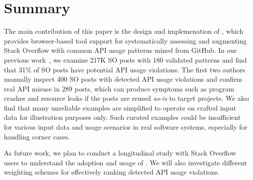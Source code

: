 \section{Summary}
\label{sec:summary}
The main contribution of this paper is the design and implemenation of {\tool}, which provides browser-based tool support for systematically assessing and augmenting Stack Overflow with common API usage patterns mined from GitHub. In our previous work~\cite{zhang2018code}, we examine 217K SO posts with 180 validated patterns and find that 31\% of SO posts have potential API usage violations. The first two authors manually inspect 400 SO posts with detected API usage violations and confirm real API misuse in 289 posts, which can produce symptoms such as program crashes and resource leaks if the posts are reused {\em as-is} to target projects. We also find that many unreliable examples are simplified to operate on crafted input data for illustration purposes only. Such curated examples could be insufficient for various input data and usage scenarios in real software systems, especially for handling corner cases. %


As future work, we plan to conduct a longitudinal study with Stack Overflow users to understand the adoption and usage of {\tool}. %
We will also investigate different weighting schemes for effectively ranking detected API usage violations. 
